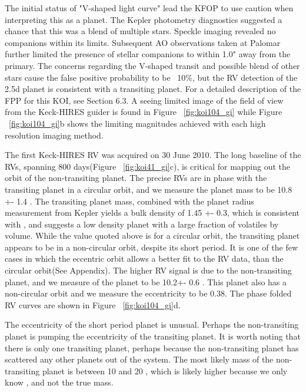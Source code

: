 \documentclass{emulateapj}
\begin{document}
The initial status of "V-shaped light curve"  lead the KFOP to use caution when interpreting this as a planet. The Kepler photometry diagnostics suggested a chance that this was a blend of multiple stars. Speckle imaging revealed no companions within its limits. Subsequent AO observations taken at Palomar further limited the presence of stellar companions to within 1.0" away from the primary.  The concerns regarding the V-shaped transit and possible blend of other stars cause the false positive probability to be ~10\%, but the RV detection of the 2.5d planet is consistent with a transiting planet. For a detailed description of the FPP for this KOI, see Section 6.3.  A seeing limited image of the field of view from the Keck-HIRES guider is found in  Figure ~\ref{fig:koi104_gi} while  Figure ~\ref{fig:koi104_gi}b shows the limiting magnitudes achieved with each high resolution imaging method.  

The first Keck-HIRES RV was acquired on 30 June 2010. The long baseline of the RVs, spanning 800 days(Figure ~\ref{fig:koi41_gi}c), is critical for mapping out the orbit of the non-transiting planet.  The precise RVs are in phase with  the transiting planet in a circular orbit, and we measure the planet mass to be 10.8 +- 1.4 \mearth.  The transiting planet mass, combined with the planet radius measurement from Kepler yields a bulk density of 1.45 +- 0.3\gcc, which is consistent with \cite{Lopez2012}, and suggests a low density planet with a large fraction of volatiles by volume. While the value quoted above is for a circular orbit, the transiting planet appears to be in a non-circular orbit, despite its short period. It is one of the few cases in which the eccentric orbit allows a better fit to the RV data, than the circular orbit(See Appendix). The higher  RV signal is due to the non-transiting planet, and we measure \msini of the planet to be  10.2+- 0.6 \mjup. This planet also has a non-circular orbit and we measure the eccentricity to be 0.38. The phase folded RV curves are shown in Figure ~\ref{fig:koi104_gi}d.

The eccentricity of the short period planet is unusual. Perhaps the non-transiting planet is pumping the eccentricity of the transiting planet. It is worth noting that there is only one transiting planet, perhaps because the non-transiting planet has scattered any other planets out of the system.  The most likely mass of the non-transiting planet is between 10 and 20 \mjup, which is likely higher because we only know \msini, and not the true mass. 
\end{document}
